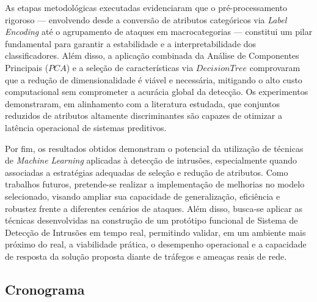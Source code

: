 \documentclass[a4paper,10pt, twocolumn]{article}
\begin{document}
As etapas metodológicas executadas evidenciaram que o pré-processamento rigoroso — envolvendo desde a conversão de atributos categóricos via \textit{Label Encoding} até o agrupamento de ataques em macrocategorias — constitui um pilar fundamental para garantir a estabilidade e a interpretabilidade dos classificadores. Além disso, a aplicação combinada da Análise de Componentes Principais ($PCA$) e a seleção de características via $Decision Tree$ comprovaram que a redução de dimensionalidade é viável e necessária, mitigando o alto custo computacional sem comprometer a acurácia global da detecção. Os experimentos demonstraram, em alinhamento com a literatura estudada, que conjuntos reduzidos de atributos altamente discriminantes são capazes de otimizar a latência operacional de sistemas preditivos.

Por fim, os resultados obtidos demonstram o potencial da utilização de técnicas de \textit{Machine Learning} aplicadas à detecção de intrusões, especialmente quando associadas a estratégias adequadas de seleção e redução de atributos. Como trabalhos futuros, pretende-se realizar a implementação de melhorias no modelo selecionado, visando ampliar sua capacidade de generalização, eficiência e robustez frente a diferentes cenários de ataques. Além disso, busca-se aplicar as técnicas desenvolvidas na construção de um protótipo funcional de Sistema de Detecção de Intrusões em tempo real, permitindo validar, em um ambiente mais próximo do real, a viabilidade prática, o desempenho operacional e a capacidade de resposta da solução proposta diante de tráfegos e ameaças reais de rede.


\subsection{Cronograma}
\end{document}
